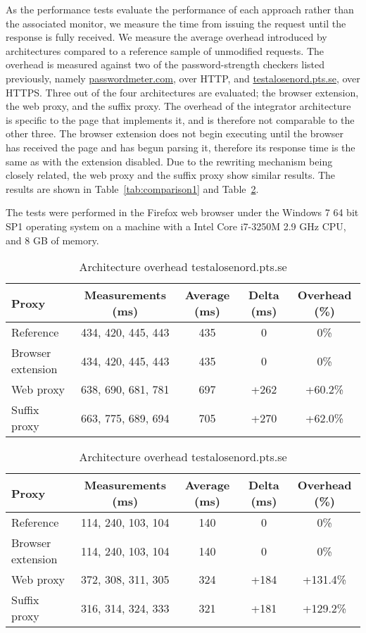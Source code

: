 \documentclass{llncs}
\begin{document}
As the performance tests evaluate the performance of each approach rather than the associated monitor, we measure
the time from issuing the request until the response is fully received. 
We measure the average overhead introduced by architectures compared to a reference sample of unmodified requests. 
The overhead is measured against two of the password-strength checkers listed 
previously, namely \url{passwordmeter.com}, over HTTP, and \url{testalosenord.pts.se}, 
over HTTPS. 
Three out of the four architectures are evaluated; the browser extension, the web proxy, and the suffix proxy. 
The overhead of the integrator architecture is specific to the 
page that implements it, and is therefore not comparable to the other three.
The browser extension does not begin executing until the browser has received the page and has begun parsing it, therefore 
its response time is the same as with the extension disabled. 
Due to the rewriting mechanism being closely related, the web proxy and the suffix proxy show similar results. 
The results are shown in Table~\ref{tab:comparison1} and Table~\ref{tab:comparison2}. 

The tests were performed in the Firefox web browser under the Windows 7 64 bit SP1 operating system on a machine with a Intel Core i7-3250M 2.9 GHz CPU, and 8 GB of memory.



\begin{table}[h!]
\center
\begin{tabular}{l|c|c|c|c}
Proxy & Measurements (ms) & Average (ms) & Delta (ms) & Overhead (\%) \\ \hline
Reference & 434, 420, 445, 443 & 435 & 0 & 0\% \\ \hline
Browser extension & 434, 420, 445, 443 & 435 & 0 & 0\% \\ \hline
Web proxy & 638, 690, 681, 781 & 697 & +262 & +60.2\% \\ \hline
Suffix proxy & 663, 775, 689, 694 & 705 & +270 & +62.0\% \\ %
\end{tabular}
\caption{Architecture overhead passwordmeter.com}
\label{tab:comparison1}
\begin{tabular}{l|c|c|c|c}
Proxy & Measurements (ms) & Average (ms) & Delta (ms) & Overhead (\%) \\ \hline
Reference & 114, 240, 103, 104 & 140 & 0 & 0\% \\ \hline
Browser extension & 114, 240, 103, 104 & 140 & 0 & 0\% \\ \hline
Web proxy & 372, 308, 311, 305 & 324 & +184 & +131.4\% \\ \hline
Suffix proxy & 316, 314, 324, 333 & 321 & +181 & +129.2\% \\ %
\end{tabular}
\caption{Architecture overhead testalosenord.pts.se}
\label{tab:comparison2}
\end{table}
\end{document}
